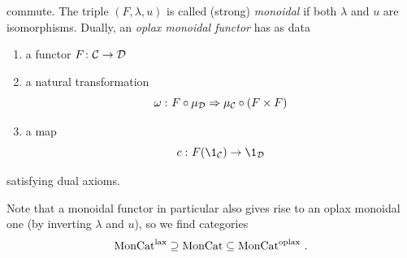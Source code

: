         commute. The triple $(F, \lambda, u)$ is called (strong) \emph{monoidal} if both $\lambda$ and $u$ are isomorphisms. Dually, an \emph{oplax monoidal functor} has as data
        \begin{enumerate}[label=\roman*)]
            \item 
                a functor $F \colon \mathcal{C} \to \mathcal{D}$
            \item 
                a natural transformation
                \begin{equation*}
                    \omega \,\colon F \circ \mu_{\mathcal{D}} \Rightarrow \mu_{\mathcal{C}} \circ (F \times F) 
                \end{equation*}
            \item 
                a map
                \begin{equation*}
                    c \,\colon F(\1_{\Cc}) \to \1_{\Dd}
                \end{equation*}
        \end{enumerate}
        satisfying dual axioms.
        \medskip

        Note that a monoidal functor in particular also gives rise to an oplax monoidal one (by inverting $\lambda$ and $u$), so we find categories
        \begin{equation*}
            \operatorname{MonCat}^{\operatorname{lax}} \supseteq \operatorname{MonCat} \subseteq \operatorname{MonCat}^{\operatorname{oplax}} \,.
        \end{equation*}

